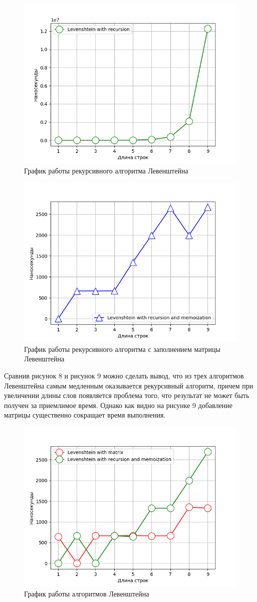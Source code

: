\documentclass[12pt,a4paper,oneside]{report}
\begin{document}
\begin{figure}[H]
	\centering
	\includegraphics[width=0.54\linewidth]{only_rec.png}
	\caption{График работы рекурсивного алгоритма Левенштейна}
\end{figure}

\begin{figure}[H]
	\centering
	\includegraphics[width=0.54\linewidth]{recM.png}
	\caption{График работы рекурсивного алгоритма с заполнением матрицы Левенштейна}
\end{figure}

\qquad Сравнив рисунок 8 и рисунок 9 можно сделать вывод, что из трех алгоритмов Левенштейна самым медленным оказывается рекурсивный алгоритм, причем при увеличении длины слов появляется проблема того, что результат не может быть получен за приемлимое время. Однако как видно на рисунке 9 добавление матрицы существенно сокращает время выполнения.

\begin{figure}[H]
	\centering
	\includegraphics[width=0.54\linewidth]{levs.png}
	\caption{График работы алгоритмов Левенштейна}
\end{figure}
\end{document}
